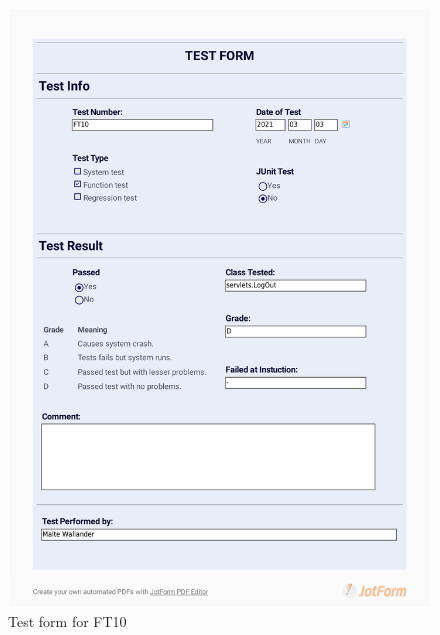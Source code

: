 \documentclass{article}
\begin{document}
 \begin{figure}
     \centering
     \includegraphics[width=13cm]{images/2021-03-03_Malte_FT10-1}
     \renewcommand\figurename{Figure}
     \caption{Test form for FT10}
     \label{fig:my_label}
 \end{figure}
 
\end{document}
